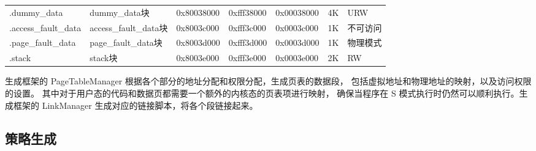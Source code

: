 \begin{table}[h!]
\begin{center}
{\begin{tabular}{|l|l|l|l|l|l|l|}
            .dummy\_data &   dummy\_data块&   0x80038000  &   0xfff38000      &   0x00038000      &   4K  &   URW              \\
            .access\_fault\_data  &   access\_fault\_data块 &   0x8003c000  &   0xfff3c000  &   0x0003c000  &   1K  &   不可访问 \\
            .page\_fault\_data    &   page\_fault\_data块   &   0x8003d000  &   0xfff3d000  &   0x0003d000  &   1K  &   物理模式 \\
            .stack      &   stack块     &   0x8003e000  &   0xfff3e000  &   0x0003e000  &   2K  &  RW \\
            \hline
        \end{tabular}
    }
    \end{center}
\end{table}

\begin{table}[h!]
    \begin{center} 
    \caption{group的.swap\_text包含的代码块} 
    \label{table:group-dist}  
    \end{center}
\end{table}

生成框架的 PageTableManager 根据各个部分的地址分配和权限分配，生成页表的数据段，
包括虚拟地址和物理地址的映射，以及访问权限的设置。
其中对于用户态的代码和数据页都需要一个额外的内核态的页表项进行映射，
确保当程序在 S 模式执行时仍然可以顺利执行。生成框架的 LinkManager 生成对应的链接脚本，将各个段链接起来。\par

\subsection{策略生成}

